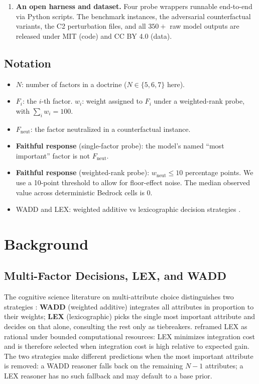 \documentclass[11pt]{article}
\begin{document}
\begin{enumerate}
\item \textbf{An open harness and dataset.} Four probe wrappers runnable end-to-end via Python scripts. The benchmark instances, the adversarial counterfactual variants, the C2 perturbation files, and all $350+$ raw model outputs are released under MIT (code) and CC BY 4.0 (data).
\end{enumerate}

\subsection{Notation}

\begin{itemize}
\item $N$: number of factors in a doctrine ($N \in \{5, 6, 7\}$ here).
\item $F_i$: the $i$-th factor. $w_i$: weight assigned to $F_i$ under a weighted-rank probe, with $\sum_i w_i = 100$.
\item $F_{\text{neut}}$: the factor neutralized in a counterfactual instance.
\item \textbf{Faithful response} (single-factor probe): the model's named ``most important'' factor is not $F_{\text{neut}}$.
\item \textbf{Faithful response} (weighted-rank probe): $w_{\text{neut}} \leq 10$ percentage points. We use a 10-point threshold to allow for floor-effect noise. The median observed value across deterministic Bedrock cells is $0$.
\item WADD and LEX: weighted additive vs lexicographic decision strategies \citep{payne1993}.
\end{itemize}

\section{Background}

\subsection{Multi-Factor Decisions, LEX, and WADD}

The cognitive science literature on multi-attribute choice distinguishes two strategies \citep{payne1993}: \textbf{WADD} (weighted additive) integrates all attributes in proportion to their weights; \textbf{LEX} (lexicographic) picks the single most important attribute and decides on that alone, consulting the rest only as tiebreakers. \citet{lieder2020} reframed LEX as rational under bounded computational resources: LEX minimizes integration cost and is therefore selected when integration cost is high relative to expected gain. The two strategies make different predictions when the most important attribute is removed: a WADD reasoner falls back on the remaining $N{-}1$ attributes; a LEX reasoner has no such fallback and may default to a base prior.
\end{document}
